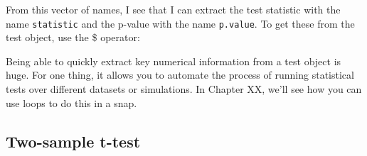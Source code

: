 \documentclass{tufte-book}\usepackage[]{graphicx}\usepackage[]{color}
\makeatletter
\newcommand{\hlcom}[1]{\textcolor[rgb]{0.678,0.584,0.686}{\textit{#1}}}%
\newcommand{\hlopt}[1]{\textcolor[rgb]{0,0,0}{#1}}%
\newcommand{\hlstd}[1]{\textcolor[rgb]{0.345,0.345,0.345}{#1}}%
\newenvironment{kframe}{%
 \def\at@end@of@kframe{}%
 \ifinner\ifhmode%
  \def\at@end@of@kframe{\end{minipage}}%
  \begin{minipage}{\columnwidth}%
 \fi\fi%
 \def\FrameCommand##1{\hskip\@totalleftmargin \hskip-\fboxsep
 \colorbox{shadecolor}{##1}\hskip-\fboxsep
     \hskip-\linewidth \hskip-\@totalleftmargin \hskip\columnwidth}%
 \MakeFramed {\advance\hsize-\width
   \@totalleftmargin\z@ \linewidth\hsize
   \@setminipage}}%
 {\par\unskip\endMakeFramed%
 \at@end@of@kframe}
\newenvironment{knitrout}{}{} %
\makeatother
\begin{document}
From this vector of names, I see that I can extract the test statistic with the name \texttt{statistic} and the p-value with the name \texttt{p.value}. To get these from the test object, use the \$ operator:


Being able to quickly extract key numerical information from a test object is huge. For one thing, it allows you to automate the process of running statistical tests over different datasets or simulations. In Chapter XX, we'll see how you can use loops to do this in a snap.

\subsection{Two-sample t-test}
\end{document}
